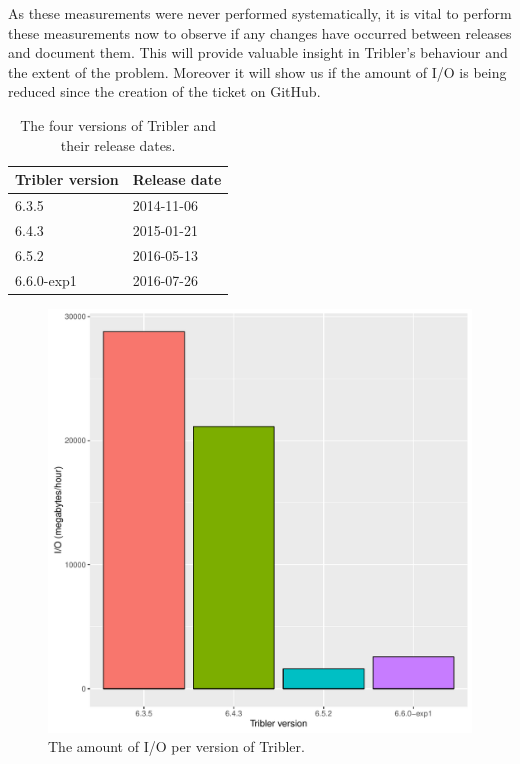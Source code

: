 As these measurements were never performed systematically, it is vital to perform these measurements now to observe if any changes have occurred between releases and document them.
This will provide valuable insight in Tribler's behaviour and the extent of the problem.
Moreover it will show us if the amount of I/O is being reduced since the creation of the ticket on GitHub.

\begin{table}[h]
	\centering
	\caption{The four versions of Tribler and their release dates.}
	\label{table:tribler_version_dates}
	\begin{tabular}{l|l}
		\textbf{Tribler version} & \textbf{Release date} \\ \hline
		6.3.5           & 2014-11-06   \\ 
		6.4.3           & 2015-01-21   \\ 
		6.5.2           & 2016-05-13   \\ 
		6.6.0-exp1      & 2016-07-26   \\ 
	\end{tabular}
\end{table}

\begin{figure}[!h]
	\centering
	\includegraphics[width=\linewidth]{experimentation/images/io_history}
	\caption{The amount of I/O per version of Tribler.}
	\label{fig:io_history}
\end{figure} 

